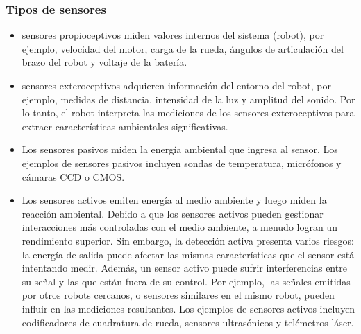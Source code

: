 \begin{frame}
    \frametitle{Tipos de sensores}

    \begin{itemize}
    \item sensores propioceptivos miden valores internos del sistema (robot), por ejemplo, velocidad del motor, carga de la rueda, ángulos de articulación del brazo del robot y voltaje de la batería.

    \item sensores exteroceptivos adquieren información del entorno del robot, por ejemplo, medidas de distancia, intensidad de la luz y amplitud del sonido. Por lo tanto, el robot interpreta las mediciones de los sensores exteroceptivos para extraer características ambientales significativas.
    \end{itemize}

    \begin{itemize}
    \item Los sensores pasivos miden la energía ambiental que ingresa al sensor. Los ejemplos de sensores pasivos incluyen sondas de temperatura, micrófonos y cámaras CCD o CMOS.

    \item Los sensores activos emiten energía al medio ambiente y luego miden la reacción ambiental. Debido a que los sensores activos pueden gestionar interacciones más controladas con el medio ambiente, a menudo logran un rendimiento superior. Sin embargo, la detección activa presenta varios riesgos: la energía de salida puede afectar las mismas características que el sensor está intentando medir. Además, un sensor activo puede sufrir interferencias entre su señal y las que están fuera de su control. Por ejemplo, las señales emitidas por otros robots cercanos, o sensores similares en el mismo robot, pueden influir en las mediciones resultantes. Los ejemplos de sensores activos incluyen codificadores de cuadratura de rueda, sensores ultrasónicos y telémetros láser.
\end{itemize}


\end{frame}


